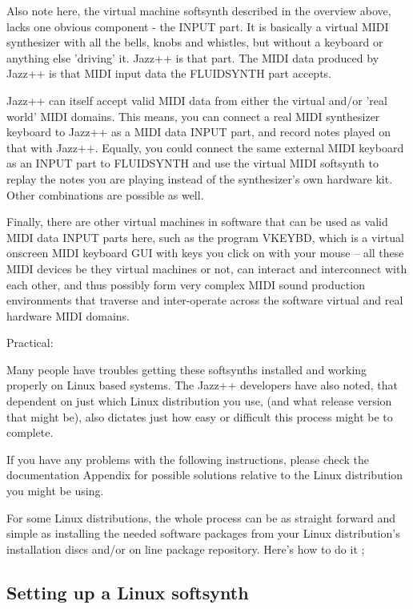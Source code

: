 \documentclass[letterpaper]{report}
\begin{document}
Also note here, the virtual machine softsynth described in the
overview above, lacks one obvious component - the INPUT part.
It is basically a virtual MIDI synthesizer with all the bells,
knobs and whistles, but without a keyboard or anything else
'driving' it. Jazz++ is that part. The MIDI data produced by Jazz++
is that MIDI input data the FLUIDSYNTH part accepts.

Jazz++ can itself accept valid MIDI data from either the virtual
and/or 'real world' MIDI domains. This means, you can connect
a real MIDI synthesizer keyboard to Jazz++ as a MIDI data INPUT
part, and record notes played on that with Jazz++. Equally, you
could connect the same external MIDI keyboard as an INPUT part
to FLUIDSYNTH and use the virtual MIDI softsynth to replay the
notes you are playing instead of the synthesizer's own hardware
kit. Other combinations are possible as well.

Finally, there are other virtual machines in software that
can be used as valid MIDI data INPUT parts here, such as the
program VKEYBD, which is a virtual onscreen MIDI keyboard GUI
with keys you click on with your mouse -- all these MIDI devices
be they virtual machines or not, can interact and interconnect
with each other, and thus possibly form very complex MIDI
sound production environments that traverse and inter-operate
across the software virtual and real hardware MIDI domains.

Practical:

Many people have troubles getting these softsynths installed and
working properly on Linux based systems. The Jazz++ developers
have also noted, that dependent on just which Linux distribution
you use, (and what release version that might be), also dictates
just how easy or difficult this process might be to complete.

If you have any problems with the following instructions,
please check the documentation Appendix for possible solutions
relative to the Linux distribution you might be using.

For some Linux distributions, the whole process can be as
straight forward and simple as installing the needed software
packages from your Linux distribution's installation discs and/or
on line package repository. Here's how to do it ;

\subsection{Setting up a Linux softsynth}
\end{document}
